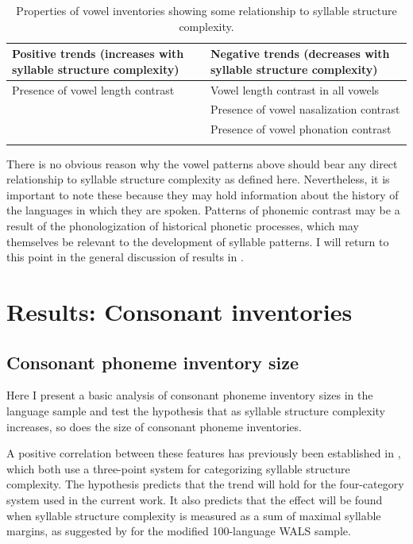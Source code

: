 \begin{table}
\begin{tabularx}{\textwidth}{QQ}
\lsptoprule
Positive trends (increases with syllable structure complexity) & Negative trends (decreases with syllable structure complexity)\\\midrule
Presence of vowel length contrast & Vowel length contrast in all vowels\\
& Presence of vowel nasalization contrast\\
& Presence of vowel phonation contrast\\
\lspbottomrule
\end{tabularx}
\caption{\label{tab:4.8}Properties of vowel inventories showing some relationship to syllable structure complexity.}
\end{table}

  There is no obvious reason why the vowel patterns above should bear any direct relationship to syllable structure complexity as defined here. Nevertheless, it is important to note these because they may hold information about the history of the languages in which they are spoken. Patterns of phonemic contrast may be a result of the phonologization of historical phonetic processes, which may themselves be relevant to the development of syllable patterns. I will return to this point in the general discussion of results in .

\section{Results: Consonant inventories}\label{sec:4.4}
\subsection{Consonant phoneme inventory size}\label{sec:4.4.1}

  Here I present a basic analysis of consonant phoneme inventory sizes in the language sample and test the hypothesis that as syllable structure complexity increases, so does the size of consonant phoneme inventories.

  A positive correlation between these features has previously been established in \citet{Maddieson2006,Maddieson2013a}, which both use a three-point system for categorizing syllable structure complexity. The hypothesis predicts that the trend will hold for the four-category system used in the current work. It also predicts that the effect will be found when syllable structure complexity is measured as a sum of maximal syllable margins, as suggested by \citet{Gordon2016} for the modified 100-language WALS sample.

